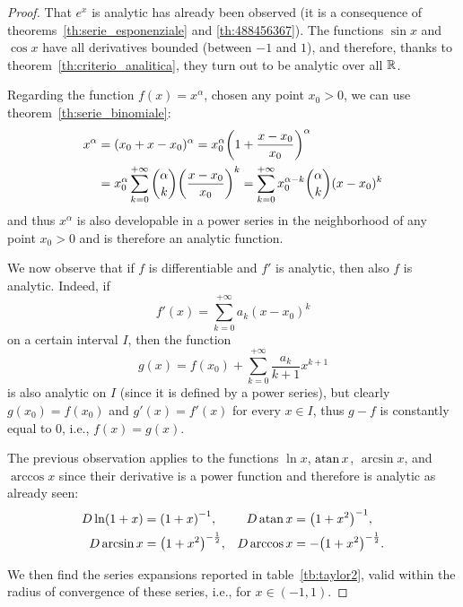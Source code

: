 \begin{proof}
    That $e^x$ is analytic has already been observed (it is a consequence of
  theorems~\ref{th:serie_esponenziale} and \ref{th:488456367}). The functions
  $\sin x$ and $\cos x$ have all derivatives bounded (between $-1$ and $1$), and
  therefore, thanks to theorem~\ref{th:criterio_analitica}, they turn out to be
  analytic over all ${\mathbb R}$.
  
    Regarding the function $f(x)=x^\alpha$, chosen any point $x_0>0$, we can use
  theorem~\ref{th:serie_binomiale}:
    \begin{align*}
    x^\alpha
    &= (x_0 + x-x_0)^\alpha
    = x_0^\alpha {\left( 1+\frac {x-x_0} {x_0} \right)}^\alpha \\
        &= x_0^\alpha \sum_{k=0}^{+\infty} {\alpha \choose k}
    {\left( \frac{x-x_0}{x_0} \right)}^k
    = \sum_{k=0}^{+\infty} x_0^{\alpha-k}{\alpha \choose k} (x-x_0)^k
  \end{align*}
    and thus $x^\alpha$ is also developable in a power series in the
  neighborhood of any point $x_0>0$ and is therefore an analytic function.

    We now observe that if $f$ is differentiable and $f'$ is analytic, then also
  $f$ is analytic. Indeed, if
  \[
    f'(x) = \sum_{k=0}^{+\infty} a_k (x-x_0)^k
  \]
  on a certain interval $I$, then the function
  \begin{equation}\label{eq:4569903}
    g(x) = f(x_0) + \sum_{k=0}^{+\infty} \frac{a_k}{k+1}x^{k+1}
  \end{equation}
    is also analytic on $I$ (since it is defined by a power series), but clearly
  $g(x_0) = f(x_0)$ and $g'(x) = f'(x)$ for every $x\in I$, thus $g-f$ is
  constantly equal to $0$, i.e., $f(x) = g(x)$.

    The previous observation applies to the functions $\ln x$, $\operatorname{atan} x$,
  $\arcsin x$, and $\arccos x$ since their derivative is a power function and
  therefore is analytic as already seen:
  \begin{align*}
    D \ln (1+x) &= {\left( 1+x \right)}^{-1}, &
    D \operatorname{atan} x &= {\left( 1+x^2 \right)}^{-1}, \\
    D \arcsin x &= {\left( 1+x^2 \right)}^{-\frac 1 2}, &
    D \arccos x &= -{\left( 1+x^2 \right)}^{-\frac 1 2}.
  \end{align*}

    We then find the series expansions reported in table~\ref{tb:taylor2}, valid
  within the radius of convergence of these series, i.e., for $x\in (-1,1)$.


\end{proof}
